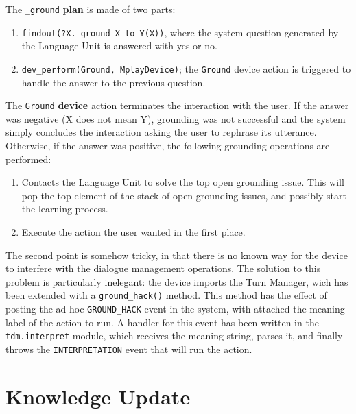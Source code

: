 The \texttt{\_ground} \textbf{plan} is made of two parts:
\begin{enumerate}
	\item \texttt{findout(?X.\_ground\_X\_to\_Y(X))}, where the system question generated by the Language Unit is answered with yes or no.
	\item \texttt{dev\_perform(Ground, MplayDevice)}; the \texttt{Ground} device action is triggered to handle the answer to the previous question.
\end{enumerate}

The \texttt{Ground} \textbf{device} action terminates the interaction with the user. If the answer was negative (X does not mean Y), grounding was not successful and the system simply concludes the interaction asking the user to rephrase its utterance. Otherwise, if the answer was positive, the following grounding operations are performed:
\begin{enumerate}
	\item Contacts the Language Unit to solve the top open grounding issue. This will pop the top element of the stack of open grounding issues, and possibly start the learning process.
	\item Execute the action the user wanted in the first place.
\end{enumerate}

The second point is somehow tricky, in that there is no known way for the device to interfere with the dialogue management operations. The solution to this problem is particularly inelegant: the device imports the Turn Manager, wich has been extended with a \texttt{ground\_hack()} method. This method has the effect of posting the ad-hoc \texttt{GROUND\_HACK} event in the system, with attached the meaning label of the action to run. A handler for this event has been written in the \texttt{tdm.interpret} module, which receives the meaning string, parses it, and finally throws the \texttt{INTERPRETATION} event that will run the action.


\section{Knowledge Update} \label{ch:interaction:learn}

